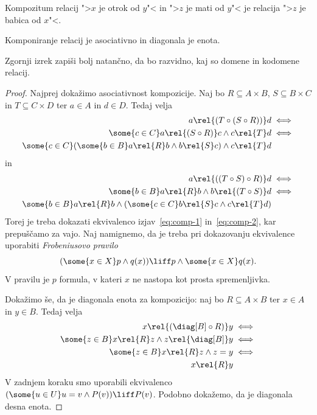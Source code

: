 \begin{zgled}
  Kompozitum relacij ">$x$ je otrok od $y$"< in ">$z$ je mati od $y$"< je relacija
  ">$z$ je babica od $x$"<.
\end{zgled}

\begin{izrek}
  Komponiranje relacij je asociativno in diagonala je enota.
\end{izrek}

\begin{vaja}
  Zgornji izrek zapiši bolj natančno, da bo razvidno, kaj so domene in kodomene relacij.
\end{vaja}

\begin{proof}
  Najprej dokažimo asociativnost kompozicije.
  Naj bo $R \subseteq A \times B$, $S \subseteq B \times C$ in $T \subseteq C \times D$ ter $a \in A$ in $d \in D$. Tedaj velja
  \begin{align}
    a \rel{(T \circ (S \circ R))} d &\iff  \notag \\
    \some{c \in C} a \rel{(S \circ R)} c \land c \rel{T} d &\iff \notag \\
    \some{c \in C} (\some{b \in B} a \rel{R} b \land b \rel{S} c) \land c \rel{T} d \label{eq:comp-1}
  \end{align}
  in
  \begin{align}
    a \rel{((T \circ S) \circ R)} d &\iff \notag \\
    \some{b \in B} a \rel{R} b \land b \rel{(T \circ S)} d &\iff \notag \\
    \some{b \in B} a \rel{R} b \land (\some{c \in C} b \rel{S} c \land c \rel{T} d) \label{eq:comp-2}
  \end{align}
  Torej je treba dokazati ekvivalenco izjav~\eqref{eq:comp-1} in~\eqref{eq:comp-2}, kar prepuščamo za vajo. Naj namignemo, da je treba pri dokazovanju ekvivalence uporabiti \emph{Frobeniusovo pravilo}
  \begin{equation*}
    (\some{x \in X} p \land q(x)) \liff p \land \some{x \in X} q(x).
  \end{equation*}
  V pravilu je $p$ formula, v kateri $x$ ne nastopa kot prosta spremenljivka.

  Dokažimo še, da je diagonala enota za kompozicijo: naj bo $R \subseteq A \times B$ ter $x \in A$ in $y \in B$. Tedaj velja
  \begin{align*}
    x \rel{(\diag[B] \circ R)} y &\iff \\
    \some{z \in B} x \rel{R} z \land z \rel{\diag[B]} y  &\iff \\
    \some{z \in B} x \rel{R} z \land z = y &\iff \\
    x \rel{R} y
  \end{align*}
  V zadnjem koraku smo uporabili ekvivalenco $(\some{u \in U} u = v \land P(v)) \liff P(v)$. Podobno dokažemo, da je diagonala desna enota.
\end{proof}

